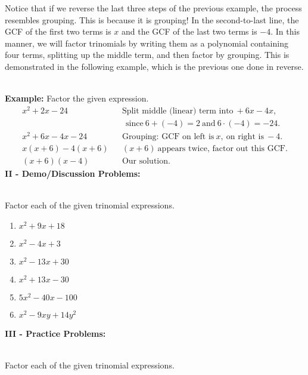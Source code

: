 \documentclass[12pt]{article}
\theoremstyle{definition}
\begin{document}
Notice that if we reverse the last three steps of the previous example, the process resembles grouping. This is because it is grouping! In the second-to-last line, the GCF of the first two terms is $x$ and the GCF of the last two terms is $- 4$. In this manner, we will factor trinomials by writing them as a polynomial containing four terms, splitting up the middle term, and then factor by grouping. This is demonstrated in the following example, which is the previous one done in reverse.\\
\ \par
{\bf Example:} Factor the given expression.
  \begin{eqnarray*}
    x^2 + 2 x - 24 &  & \text{Split middle (linear) term into} \ + 6
    x - 4 x,\\
    & & \ \ \text{since} \ 6+ (-4)=2 \ \text{and} \ 6\cdot (-4)=-24. \\
		x^2 + 6 x - 4 x - 24 &  & \text{Grouping: GCF on left is} \ x, \ \text{on right is} \ - 4.\\
    x (x + 6) - 4 (x + 6) &  & (x + 6) \ \text{appears twice, factor out this GCF.}\\
    (x + 6) (x - 4) &  & \text{Our solution.}
  \end{eqnarray*}
{\bf II - Demo/Discussion Problems:}\\
\ \par
Factor each of the given trinomial expressions.
\begin{multicols}{3}
\begin{enumerate}
	\item $x^2+9x+18$
	\item $x^2-4x+3$
	\item $x^2-13x+30$
	\item $x^2+13x-30$
	\item $5x^2-40x-100$
	\item $x^2-9xy+14y^2$
\end{enumerate}
\end{multicols}
{\bf III - Practice Problems:}\\
\ \par
Factor each of the given trinomial expressions.
\end{document}
